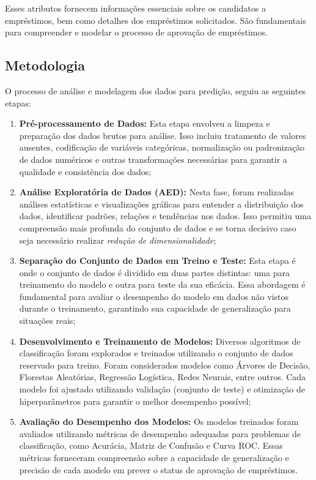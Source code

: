 \documentclass[a4paper,12pt]{article} %
\begin{document}
Esses atributos fornecem informações essenciais sobre os candidatos a empréstimos, bem como detalhes dos empréstimos solicitados. São fundamentais para compreender e modelar o processo de aprovação de empréstimos.

\subsection{Metodologia}
O processo de análise e modelagem dos dados para predição, seguiu as seguintes etapas:

\begin{enumerate}
    \item \textbf{Pré-processamento de Dados:} Esta etapa envolveu a limpeza e preparação dos dados brutos para análise. Isso incluiu tratamento de valores ausentes, codificação de variáveis categóricas, normalização ou padronização de dados numéricos e outras transformações necessárias para garantir a qualidade e consistência dos dados;
    \item \textbf{Análise Exploratória de Dados (AED):} Nesta fase, foram realizadas análises estatísticas e visualizações gráficas para entender a distribuição dos dados, identificar padrões, relações e tendências nos dados. Isso permitiu uma compreensão mais profunda do conjunto de dados e se torna decisivo caso seja necessário realizar \textit{redução de dimensionalidade};
    \item \textbf{Separação  do Conjunto de Dados em Treino e Teste:} Esta etapa é onde o conjunto de dados é dividido em duas partes distintas: uma para treinamento do modelo e outra para teste da sua eficácia. Essa abordagem é fundamental para avaliar o desempenho do modelo em dados não vistos durante o treinamento, garantindo sua capacidade de generalização para situações reais;
    \item \textbf{Desenvolvimento e Treinamento de Modelos:} Diversos algoritmos de classificação foram explorados e treinados utilizando o conjunto de dados reservado para treino. Foram considerados modelos como Árvores de Decisão, Florestas Aleatórias, Regressão Logística, Redes Neurais, entre outros. Cada modelo foi ajustado utilizando validação (conjunto de teste) e otimização de hiperparâmetros para garantir o melhor desempenho possível;
    \item \textbf{Avaliação do Desempenho dos Modelos:} Os modelos treinados foram avaliados utilizando métricas de desempenho adequadas para problemas de classificação, como Acurácia, Matriz de Confusão e Curva ROC. Essas métricas forneceram compreensão sobre a capacidade de generalização e precisão de cada modelo em prever o status de aprovação de empréstimos.
\end{enumerate}
\end{document}
